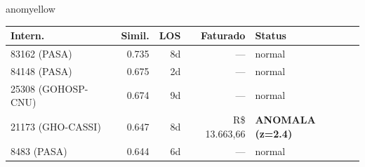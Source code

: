 \documentclass[a4paper,10pt]{article}
\begin{document}
\begin{anomalycard}[Internacao 342 | GHO-ICS | MODERADO (z=2.78)]{anomyellow}
\begin{tabular}{l r r r l}\toprule\textbf{Intern.} & \textbf{Simil.} & \textbf{LOS} & \textbf{Faturado} & \textbf{Status} \\\midrule
83162 (PASA) & 0.735 & 8d & --- & \textcolor{jcubeblue}{normal} \\
84148 (PASA) & 0.675 & 2d & --- & \textcolor{jcubeblue}{normal} \\
25308 (GOHOSP-CNU) & 0.674 & 9d & --- & \textcolor{jcubeblue}{normal} \\
21173 (GHO-CASSI) & 0.647 & 8d & R\$ 13.663,66 & \textcolor{anomred}{\textbf{ANOMALA (z=2.4)}} \\
8483 (PASA) & 0.644 & 6d & --- & \textcolor{jcubeblue}{normal} \\
\bottomrule\end{tabular}


\end{anomalycard}

\newpage
\end{document}
